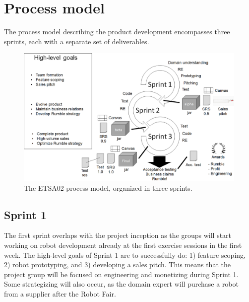 \documentclass{scrreprt}
\begin{document}
\section{Process model} \label{sec:process}
The process model describing the product development encompasses three sprints, each with a separate set of deliverables. 

\begin{figure}
\centering
\includegraphics[width=1.0\textwidth]{figures/processModel.png}
\caption{The ETSA02 process model, organized in three sprints.}
\label{fig:overview}
\end{figure}

\subsection{Sprint 1}
The first sprint overlaps with the project inception as the groups will start working on robot development already at the first exercise sessions in the first week. The high-level goals of Sprint 1 are to successfully do: 1) feature scoping, 2) robot prototyping, and 3) developing a sales pitch. This means that the project group will be focused on engineering and monetizing during Sprint 1. Some strategizing will also occur, as the domain expert will purchase a robot from a supplier after the Robot Fair.
\end{document}
